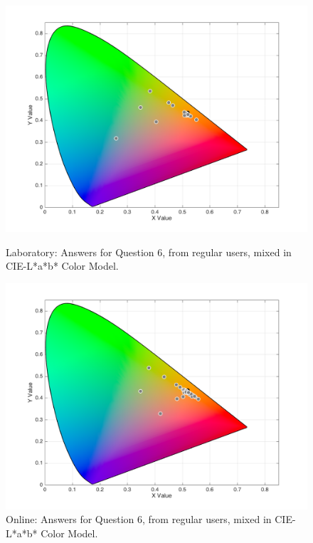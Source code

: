 \begin{figure}[!htbp]
  \centering
  \vspace{-15pt}
  \begin{minipage}{0.48\textwidth}
    \centering
    \includegraphics[width=\textwidth]{images/results/6_lab_Labresponses.png}
    \caption[Laboratory: Answers for Question 6, from regular users, mixed in CIE-L*a*b* Color Model.]{Laboratory: Answers for Question 6, from regular users, mixed in CIE-L*a*b* Color Model.}
    \label{fig:lablabregular_6}
  \end{minipage}\hfill
  \begin{minipage}{0.48\textwidth}
    \centering
    \includegraphics[width=\textwidth]{images/results/6_online_Labresponses.png}
    \caption[Online: Answers for Question 6, from regular users, mixed in CIE-L*a*b* Color Model.]{Online: Answers for Question 6, from regular users, mixed in CIE-L*a*b* Color Model.}
    \label{fig:onlinelabregular_6}
  \end{minipage}
  \vspace{-5pt}
\end{figure}
